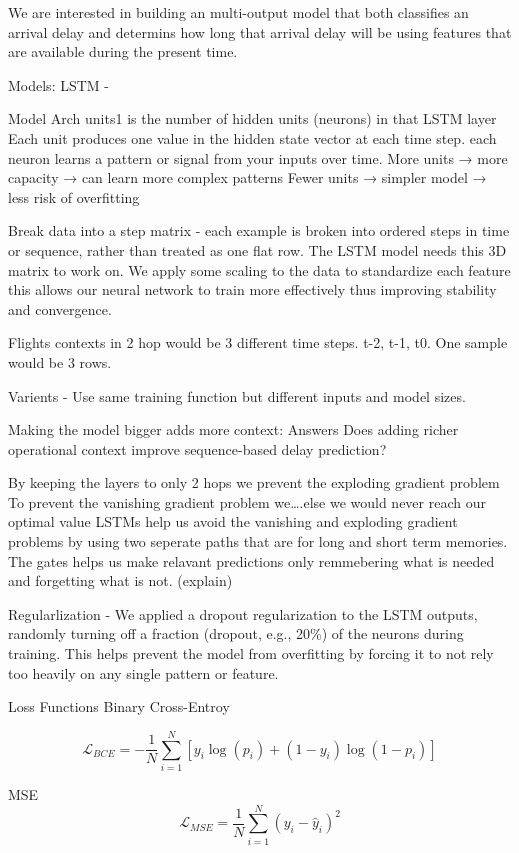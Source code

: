 \documentclass[
  letterpaper,
  DIV=11,
  numbers=noendperiod]{scrartcl}
\begin{document}
We are interested in building an multi-output model that both classifies
an arrival delay and determins how long that arrival delay will be using
features that are available during the present time.

Models: LSTM -

Model Arch units1 is the number of hidden units (neurons) in that LSTM
layer Each unit produces one value in the hidden state vector at each
time step. each neuron learns a pattern or signal from your inputs over
time. More units → more capacity → can learn more complex patterns Fewer
units → simpler model → less risk of overfitting

Break data into a step matrix - each example is broken into ordered
steps in time or sequence, rather than treated as one flat row. The LSTM
model needs this 3D matrix to work on. We apply some scaling to the data
to standardize each feature this allows our neural network to train more
effectively thus improving stability and convergence.

Flights contexts in 2 hop would be 3 different time steps. t-2, t-1, t0.
One sample would be 3 rows.

Varients - Use same training function but different inputs and model
sizes.

Making the model bigger adds more context: Answers Does adding richer
operational context improve sequence-based delay prediction?

By keeping the layers to only 2 hops we prevent the exploding gradient
problem To prevent the vanishing gradient problem we\ldots.else we would
never reach our optimal value LSTMs help us avoid the vanishing and
exploding gradient problems by using two seperate paths that are for
long and short term memories. The gates helps us make relavant
predictions only remmebering what is needed and forgetting what is not.
(explain)

Regularlization - We applied a dropout regularization to the LSTM
outputs, randomly turning off a fraction (dropout, e.g., 20\%) of the
neurons during training. This helps prevent the model from overfitting
by forcing it to not rely too heavily on any single pattern or feature.

Loss Functions Binary Cross-Entroy

\[
\mathcal{L}_{BCE} = -\frac{1}{N} \sum_{i=1}^{N} \left[ y_i \log(p_i) + (1 - y_i) \log(1 - p_i) \right]
\]

MSE \[
\mathcal{L}_{MSE} = \frac{1}{N} \sum_{i=1}^{N} (y_i - \hat{y}_i)^2
\]
\end{document}
